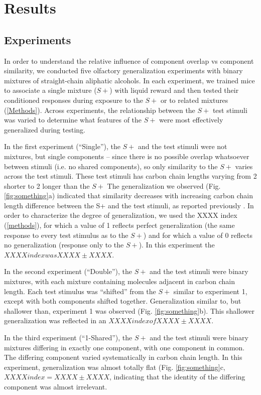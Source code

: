 \section{Results}

\subsection{Experiments}
In order to understand the relative influence of component overlap vs component similarity, we conducted five olfactory generalization experiments with binary mixtures of straight-chain aliphatic alcohols.  In each experiment, we trained mice to associate a single mixture ($S+$) with liquid reward and then tested their conditioned responses during exposure to the $S+$ or to related mixtures (\ref{Methods}).  Across experiments, the relationship between the $S+$ test stimuli was varied to determine what features of the $S+$ were most effectively generalized during testing.  

In the first experiment (``Single''), the $S+$ and the test stimuli were not mixtures, but single components -- since there is no possible overlap whatsoever between stimuli (i.e. no shared components), so only similarity to the $S+$ varies across the test stimuli.  These test stimuli has carbon chain lengths varying from 2 shorter to 2 longer than the $S+$  The generalization we observed (Fig. \ref{fig:something}a) indicated that similarity decreases with increasing carbon chain length difference between the S+ and the test stimuli, as reported previously \cite{}.  In order to characterize the degree of generalization, we used the XXXX index (\ref{methods}), for which a value of 1 reflects perfect generalization (the same response to every test stimulus as to the $S+$) and for which a value of 0 reflects no generalization (response only to the $S+$).  In this experiment the $XXXX index was XXXX \pm XXXX$.  

In the second experiment (``Double''), the $S+$ and the test stimuli were binary mixtures, with each mixture containing molecules adjacent in carbon chain length.  Each test stimulus was ``shifted'' from the $S+$ similar to experiment 1, except with both components shifted together.  Generalization similar to, but shallower than, experiment 1 was observed (Fig. \ref{fig:something}b).  This shallower generalization was reflected in an $XXXX index of XXXX \pm XXXX$.  

In the third experiment (``1-Shared''), the $S+$ and the test stimuli were binary mixtures differing in exactly one component, with one component in common.  The differing component varied systematically in carbon chain length.  In this experiment, generalization was almost totally flat (Fig. \ref{fig:something}c, $XXXX index = XXXX \pm XXXX$, indicating that the identity of the differing component was almost irrelevant.  

